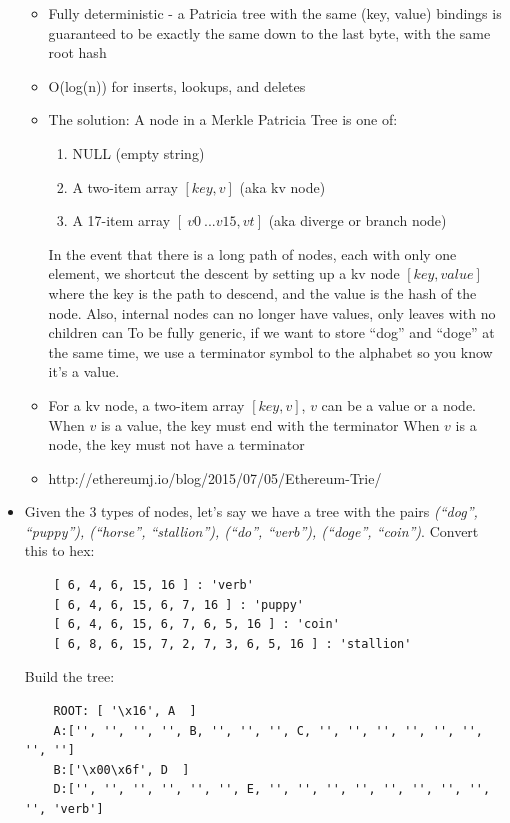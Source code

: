\documentclass{article}
\begin{document}
\begin{itemize}
\begin{itemize}
      \item Fully deterministic - a Patricia tree with the same (key, value) bindings is guaranteed to be exactly the same down to the last byte, with the same
        root hash
      \item O(log(n)) for inserts, lookups, and deletes
      \item The solution: A node in a Merkle Patricia Tree is one of:
        \begin{enumerate}
          \item NULL (empty string)
          \item A two-item array $[key, v]$ (aka kv node)
          \item A 17-item array $[\ v0\ ... v15, vt]$ (aka diverge or branch node)
        \end{enumerate}
        \subitem In the event that there is a long path of nodes, each with only one element, we shortcut the descent by setting
        up a kv node $[key, value]$ where the key is the path to descend, and the value is the hash of the node. 
        \subitem Also, internal nodes can no longer have values, only leaves with no children can
        \subitem To be fully generic, if we want to store ``dog'' and ``doge'' at the same time, we use a terminator symbol to the alphabet
        so you know it's a value.
      \item For a kv node, a two-item array $[key, v]$, $v$ can be a value or a node.
        \subitem When $v$ is a value, the key must end with the terminator
        \subitem When $v$ is a node, the key must not have a terminator
      \item http://ethereumj.io/blog/2015/07/05/Ethereum-Trie/
    \end{itemize}
  \item Given the 3 types of nodes, let's say we have a tree with the pairs \emph{(``dog'', ``puppy''), (``horse'', ``stallion''), (``do'', ``verb''), (``doge'', ``coin'')}.
    \subitem Convert this to hex:
    \begin{lstlisting}
    [ 6, 4, 6, 15, 16 ] : 'verb'
    [ 6, 4, 6, 15, 6, 7, 16 ] : 'puppy'
    [ 6, 4, 6, 15, 6, 7, 6, 5, 16 ] : 'coin'
    [ 6, 8, 6, 15, 7, 2, 7, 3, 6, 5, 16 ] : 'stallion'
    \end{lstlisting}
    \subitem Build the tree:
    \begin{lstlisting}
    ROOT: [ '\x16', A  ]
    A:['', '', '', '', B, '', '', '', C, '', '', '', '', '', '', '', '']
    B:['\x00\x6f', D  ]
    D:['', '', '', '', '', '', E, '', '', '', '', '', '', '', '', '', 'verb']

\end{lstlisting}
\end{itemize}
\end{document}
